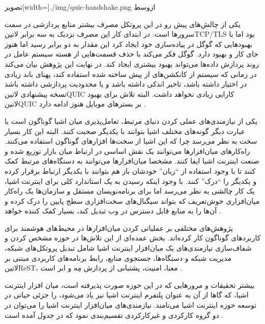 ‌تصویر[width=\textwidth]{./img/quic-handshake.png}
‌ازوسط

یکی از چالش‌های پیش رو در این پروتکل مصرف بیشتر منابع پردازشی در سمت سرورها است. در ابتدای کار این مصرف نزدیک به سه برابر ‌لاتین{TCP/TLS} بود اما با بهبودهایی که گوگل در پیاده‌سازی خود ایجاد کرد
این مقدار به دو برابر رسید اما هنوز جای کار و بهبود دارد. گوگل فکر می‌کند با حذف قسمت‌هایی از هسته سیستم عامل در روند پردازش داده‌ها می‌تواند بهبود بیشتری ایجاد کند.
در نهایت این پژوهش بیان می‌کند در زمانی که سیستم از کانکشن‌های از پیش ساخته شده استفاده کند، پهنای باند زیادی در اختیار داشته باشد، تاخیر اندکی داشته باشد و یا محدودیت پردازشی داشته باشد نسخه پیشنهادی
‌لاتین{QUIC} کارایی زیادی نخواهد داشت. البته تلاش برای بهبود ‌لاتین{QUIC} بر بسترهای موبایل هنوز ادامه دارد
.


یکی از نیازمندی‌های عملی کردن دنیای مرتبط، تعامل‌پذیری میان اشیا گوناگون است یا عبارت دیگر گونه‌های مختلف اشیا بتوانند با یکدیگر صحبت کنند.
البته این کار بسیار سخت به نظر می‌رسد چرا که این اشیا از سخت‌ها افزارهای گوناگون استفاده می‌کنند.
راه‌کارهای میان‌افزارها می‌توانند یک نقش اساسی در ارتباط میان بازار توزیع شده و صنعت اینترنت اشیا ایفا کنند.
مشخصا میان‌افزارها می‌توانند به دستگاه‌های مرتبط کمک کنند تا با وجود استفاده از ``زبان'' خودشان باز هم بتوانند با یکدیگر ارتباط برقرار کرده و یکدیگر را ``درک'' کنند.
با وجود اینکه رسیدن به یک استاندارد کلی برای اینترنت اشیا، یک کار چالشی به نظر می‌رسد اما برای برنامه‌نویسان مستقل و سازمان‌ها یک راه‌کار میان‌افزاری خوش‌تعریف
که بتواند سیگنال‌های سخت‌افزاری سطح پایین را درک کرده و آن‌ها را به منابع قابل دسترس در وب تبدیل کند،
بسیار کمک کننده خواهد
.

پژوهش‌های مختلفی بر عملیاتی کردن میان‌افزارها در محیط‌های هوشمند برای کاربردهای گوناگون کار کرده‌اند.
بخش عمده‌ای از این تلاش‌ها در حوزه مشخص کردن و شفاف‌سازی نیازمندی‌های یک میان‌افزار اینترنت اشیا شامل
تبدیل پروتکل‌های شبکه، مدیریت شبکه و دستگاه‌ها، جستجوی منابع، رابط برنامه‌های کاربردی مبتنی بر ‌لاتین{ReST}، معنا، امنیت، پشتبانی از پردازش مِه و ابر است
.

بیشتر تحقیقات و مرورهایی که در این حوزه صورت پذیرفته است، میان افزار اینترنت اشیا، که گاها از آن به عنوان پلتفرم اینترنت اشیا نیز یاد می‌شود، را جزئی حیاتی در
توسعه حوزه اینترنت اشیا می‌نامند. نیازمندی‌های میان‌افزار اینترنت اشیا را می‌توان در دو گروه کارکردی و غیرکارکردی تقسیم‌بندی نمود که در جدول 
آمده است
.

